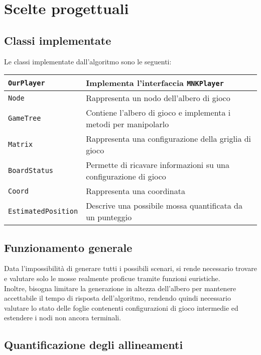 \documentclass[11pt]{article}
\begin{document}
\section*{Scelte progettuali}
\subsection*{Classi implementate}
Le classi implementate dall'algoritmo sono le seguenti:
\begin{table}[H]	%
\centering			%
\def\arraystretch{1.5}
\begin{tabular}{|l|p{4in}|}	%
\hline	%
\texttt{OurPlayer} & Implementa l'interfaccia \texttt{MNKPlayer} \\ \hline
\texttt{Node} & Rappresenta un nodo dell'albero di gioco \\ \hline
\texttt{GameTree} & Contiene l'albero di gioco e implementa i metodi per manipolarlo \\ \hline
\texttt{Matrix} & Rappresenta una configurazione della griglia di gioco \\ \hline
\texttt{BoardStatus} & Permette di ricavare informazioni su una configurazione di gioco \\ \hline
\texttt{Coord} & Rappresenta una coordinata \\ \hline
\texttt{EstimatedPosition} & Descrive una possibile mossa quantificata da un punteggio \\ \hline
\end{tabular}
\end{table}

\subsection*{Funzionamento generale}
Data l'impossibilità di generare tutti i possibili scenari, si rende necessario trovare e valutare solo le mosse realmente proficue tramite funzioni euristiche.\\
Inoltre, bisogna limitare la generazione in altezza dell'albero per mantenere accettabile il tempo di risposta dell'algoritmo, rendendo quindi necessario valutare lo stato delle foglie contenenti configurazioni di gioco intermedie ed estendere i nodi non ancora terminali.

\newpage

\subsection*{Quantificazione degli allineamenti}
\end{document}
